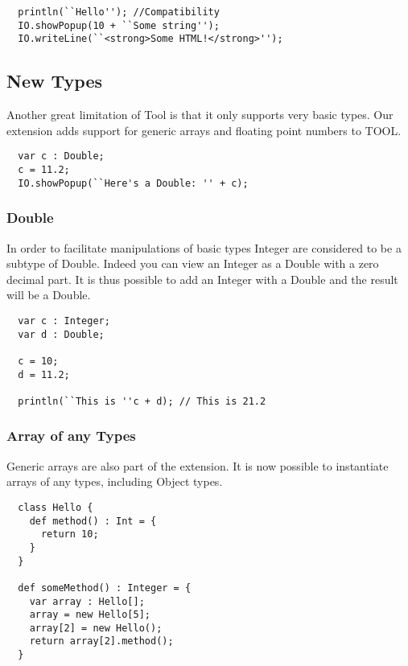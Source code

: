 \begin{lstlisting}
  println(``Hello''); //Compatibility
  IO.showPopup(10 + ``Some string'');
  IO.writeLine(``<strong>Some HTML!</strong>'');
\end{lstlisting}

\subsection{New Types}

Another great limitation of Tool is that it only supports very basic
types. Our extension adds support for generic arrays and floating
point numbers to TOOL.

\begin{lstlisting}
  var c : Double;
  c = 11.2;
  IO.showPopup(``Here's a Double: '' + c);
\end{lstlisting}


\subsubsection{Double}

In order to facilitate manipulations of basic types Integer are
considered to be a subtype of Double. Indeed you can view an Integer
as a Double with a zero decimal part. It is thus possible to add an
Integer with a Double and the result will be a Double.

\begin{lstlisting}
  var c : Integer;
  var d : Double;

  c = 10;
  d = 11.2;

  println(``This is ''c + d); // This is 21.2
\end{lstlisting}

\subsubsection{Array of any Types}

Generic arrays are also part of the extension. It is now possible to
instantiate arrays of any types, including Object types.

\begin{lstlisting}
  class Hello {
    def method() : Int = {
      return 10;
    }
  }

  def someMethod() : Integer = {
    var array : Hello[];
    array = new Hello[5];
    array[2] = new Hello();
    return array[2].method();
  }
\end{lstlisting}


